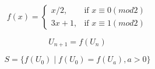 \documentclass{article}
\begin{document}
\[
f(x) =
\begin{cases} 
x/2, & \text{if } x \equiv 0 (mod 2) \\ 
3x + 1, & \text{if } x \equiv 1 (mod 2)
\end{cases}
\]

\[
U_{n + 1} =  f(U_n)
\]

\[S = \{f(U_0) \mid f(U_0) = f(U_a), a > 0\}\]
\end{document}
